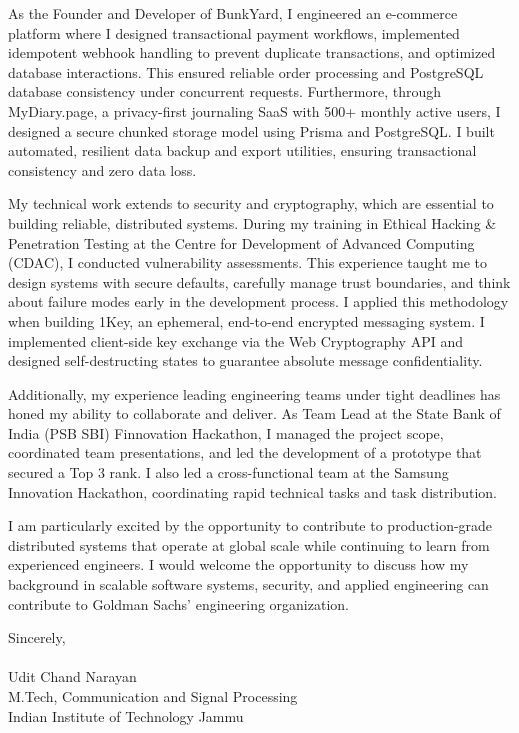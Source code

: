 \documentclass[11pt,a4paper]{article}
\begin{document}
As the Founder and Developer of BunkYard, I engineered an e-commerce platform where I designed transactional payment workflows, implemented idempotent webhook handling to prevent duplicate transactions, and optimized database interactions. This ensured reliable order processing and PostgreSQL database consistency under concurrent requests. Furthermore, through MyDiary.page, a privacy-first journaling SaaS with 500+ monthly active users, I designed a secure chunked storage model using Prisma and PostgreSQL. I built automated, resilient data backup and export utilities, ensuring transactional consistency and zero data loss.

My technical work extends to security and cryptography, which are essential to building reliable, distributed systems. During my training in Ethical Hacking \& Penetration Testing at the Centre for Development of Advanced Computing (CDAC), I conducted vulnerability assessments. This experience taught me to design systems with secure defaults, carefully manage trust boundaries, and think about failure modes early in the development process. I applied this methodology when building 1Key, an ephemeral, end-to-end encrypted messaging system. I implemented client-side key exchange via the Web Cryptography API and designed self-destructing states to guarantee absolute message confidentiality.

Additionally, my experience leading engineering teams under tight deadlines has honed my ability to collaborate and deliver. As Team Lead at the State Bank of India (PSB SBI) Finnovation Hackathon, I managed the project scope, coordinated team presentations, and led the development of a prototype that secured a Top 3 rank. I also led a cross-functional team at the Samsung Innovation Hackathon, coordinating rapid technical tasks and task distribution.

I am particularly excited by the opportunity to contribute to production-grade distributed systems that operate at global scale while continuing to learn from experienced engineers. I would welcome the opportunity to discuss how my background in scalable software systems, security, and applied engineering can contribute to Goldman Sachs' engineering organization.

\vspace{1.0em}
\noindent Sincerely,\\
\vspace{1.0em}\\
\noindent Udit Chand Narayan\\
M.Tech, Communication and Signal Processing\\
Indian Institute of Technology Jammu
\end{document}
